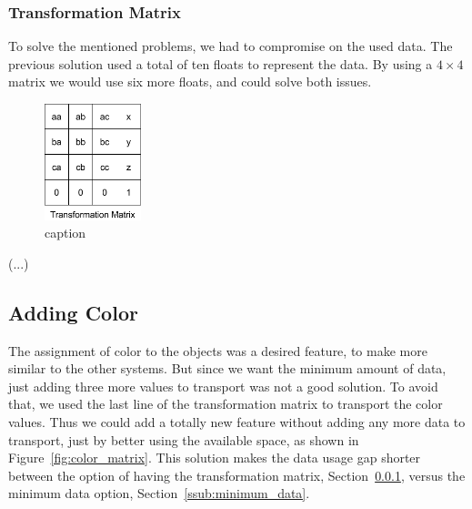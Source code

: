 
\subsubsection{Transformation Matrix} %
\label{ssub:transformation_matrix}

To solve the mentioned problems, we had to compromise on the used data. The previous solution used a total of ten floats to represent the data. 
By using a $4\times4$ matrix we would use six more floats, and could solve both issues.


\begin{figure}[h!]
	\centering
	\includegraphics[width=0.25\textwidth]{images/solution/Transformation_Matrix.png}
	\caption{caption}
	\label{fig:tmatrix}
\end{figure}

(...)





\subsection{Adding Color} %
\label{sub:adding_color}

The assignment of color to the objects was a desired feature, to make \TheName more similar to the other systems. But since we want the minimum amount of data, just adding three more values to transport was not a good solution. To avoid that, we used the last line of the transformation matrix to transport the color values. Thus we could add a totally new feature without adding any more data to transport, just by better using the available space, as shown in Figure~\ref{fig:color_matrix}. This solution makes the data usage gap shorter between the option of having the transformation matrix, Section~\ref{ssub:transformation_matrix}, versus the minimum data option, Section~\ref{ssub:minimum_data}.

